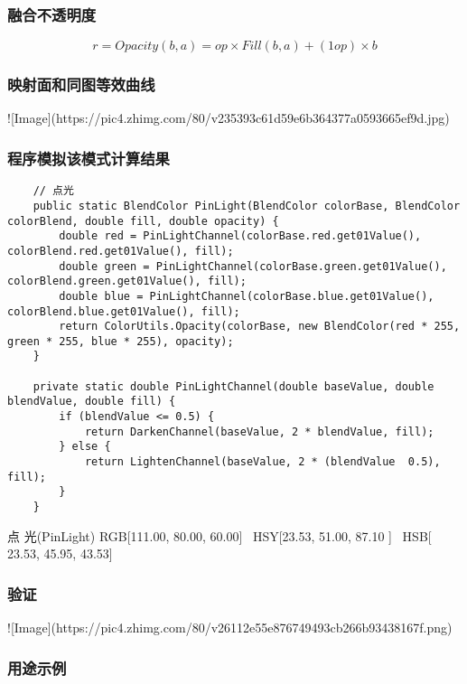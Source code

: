 \subsubsection{ 融合不透明度}

$$r=Opacity(b,a)=op\times Fill(b,a)+(1op)\times b$$

\subsubsection{ 映射面和同图等效曲线}

![Image](https://pic4.zhimg.com/80/v235393c61d59e6b364377a0593665ef9d.jpg)

\subsubsection{ 程序模拟该模式计算结果}

\begin{lstlisting}
	// 点光
	public static BlendColor PinLight(BlendColor colorBase, BlendColor colorBlend, double fill, double opacity) {
		double red = PinLightChannel(colorBase.red.get01Value(), colorBlend.red.get01Value(), fill);
		double green = PinLightChannel(colorBase.green.get01Value(), colorBlend.green.get01Value(), fill);
		double blue = PinLightChannel(colorBase.blue.get01Value(), colorBlend.blue.get01Value(), fill);
		return ColorUtils.Opacity(colorBase, new BlendColor(red * 255, green * 255, blue * 255), opacity);
	}
	
	private static double PinLightChannel(double baseValue, double blendValue, double fill) {
		if (blendValue <= 0.5) {
			return DarkenChannel(baseValue, 2 * blendValue, fill);
		} else {
			return LightenChannel(baseValue, 2 * (blendValue  0.5), fill);
		}
	}
\end{lstlisting}



点    光(PinLight)      RGB[111.00,  80.00,  60.00]~ HSY[23.53,  51.00,  87.10 ]~ HSB[ 23.53,  45.95,  43.53]


\subsubsection{ 验证}

![Image](https://pic4.zhimg.com/80/v26112e55e876749493cb266b93438167f.png)

\subsubsection{ 用途示例}

